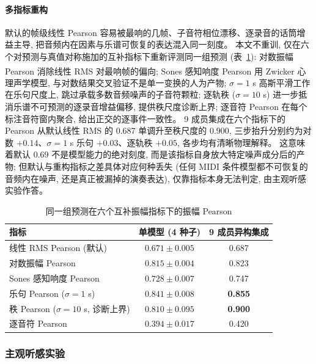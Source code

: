 \documentclass[a4paper, UTF8, zihao=-4, fontset=fandol]{ctexart}
\newcommand{\upcite}[1]{\textsuperscript{\cite{#1}}}
\begin{document}
\paragraph{多指标重构}\quad
默认的帧级线性 Pearson 容易被最响的几帧、子音符相位漂移、逐录音的话筒增益主导, 把音频内在因素与乐谱可恢复的表达混入同一刻度。 本文不重训, 仅在六个对预测与真值对称施加的互补指标下重新评测同一组预测 (表~\ref{tab:metricpanel}): 对数振幅 Pearson 消除线性 RMS 对最响帧的偏向; Sones 感知响度 Pearson\upcite{zwicker} 用 Zwicker 心理声学模型, 与对数结果交叉验证不是单一变换的人为产物; $\sigma = 1$ s 高斯平滑工作在乐句尺度上, 跳过承载多数音频噪声的子音符颗粒; 逐轨秩 ($\sigma = 10$ s) 进一步抵消乐谱不可预测的逐录音增益偏移, 提供秩尺度诊断上界; 逐音符 Pearson 在每个标注音符窗内聚合, 给出正交的逐事件一致性。 9 成员集成在六个指标下的 Pearson 从默认线性 RMS 的 0.687 单调升至秩尺度的 0.900, 三步抬升分别约为对数 $+0.14$、$\sigma = 1$ s 乐句 $+0.03$、逐轨秩 $+0.05$, 各步均有清晰物理解释。 这意味着默认 0.69 不是模型能力的绝对刻度, 而是该指标自身放大特定噪声成分后的产物; 但默认与重构指标之差具体对应何种丢失 (任何 MIDI 条件模型都不可恢复的音频内在噪声, 还是真正被漏掉的演奏表达), 仅靠指标本身无法判定, 由主观听感实验作答。

\begin{table}[htbp]\centering
\caption{同一组预测在六个互补振幅指标下的振幅 Pearson}\label{tab:metricpanel}
\begin{tabular}{lcc}
\toprule
指标 & 单模型 (4 种子) & 9 成员异构集成 \\
\midrule
线性 RMS Pearson (默认) & $0.671 \pm 0.005$ & 0.687 \\
对数振幅 Pearson & $0.815 \pm 0.004$ & 0.823 \\
Sones 感知响度 Pearson & $0.728 \pm 0.007$ & 0.747 \\
乐句 Pearson ($\sigma = 1$ s) & $0.841 \pm 0.008$ & \textbf{0.855} \\
秩 Pearson ($\sigma = 10$ s, 诊断上界) & $0.810 \pm 0.095$ & \textbf{0.900} \\
逐音符 Pearson & $0.394 \pm 0.017$ & 0.420 \\
\bottomrule
\end{tabular}
\end{table}

\subsubsection{主观听感实验}
\end{document}
